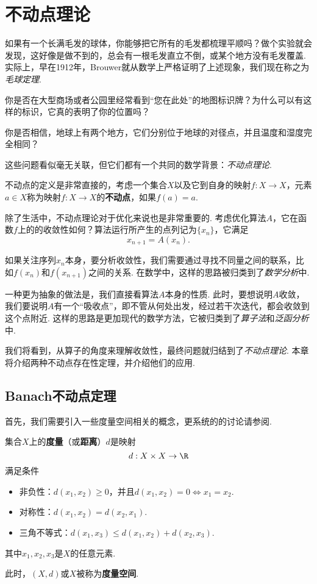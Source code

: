 \chapter{不动点理论}\label{chap:fixed-point-theory}

如果有一个长满毛发的球体，你能够把它所有的毛发都梳理平顺吗？做个实验就会发现，这好像是做不到的，总会有一根毛发直立不倒，或某个地方没有毛发覆盖. 实际上，早在1912年，Brouwer就从数学上严格证明了上述现象，我们现在称之为\emph{毛球定理}.

你是否在大型商场或者公园里经常看到“您在此处”的地图标识牌？为什么可以有这样的标识，它真的表明了你的位置吗？

你是否相信，地球上有两个地方，它们分别位于地球的对径点，并且温度和湿度完全相同？

这些问题看似毫无关联，但它们都有一个共同的数学背景：\emph{不动点理论}.

不动点的定义是非常直接的，考虑一个集合$X$以及它到自身的映射$f:X\to X$，元素$a\in X$称为映射$f:X\to X$的\textbf{不动点}，如果$f(a)=a$. 

除了生活中，不动点理论对于优化来说也是非常重要的. 考虑优化算法$A$，它在函数$f$上的的收敛性如何？算法运行所产生的点列记为$\{x_n\}$，它满足
\[x_{n+1}=A(x_n).\] 

如果关注序列$x_n$本身，要分析收敛性，我们需要通过寻找不同量之间的联系，比如$f(x_n)$和$f(x_{n+1})$之间的关系. 在数学中，这样的思路被归类到了\emph{数学分析}中.  

一种更为抽象的做法是，我们直接看算法$A$本身的性质. 此时，要想说明$A$收敛，我们要说明$A$有一个“吸收点”，即不管从何处出发，经过若干次迭代，都会收敛到这个点附近. 这样的思路是更加现代的数学方法，它被归类到了\emph{算子法}和\emph{泛函分析}中. 

我们将看到，从算子的角度来理解收敛性，最终问题就归结到了\emph{不动点理论}. 本章将介绍两种不动点存在性定理，并介绍他们的应用.

\section{Banach不动点定理}

首先，我们需要引入一些度量空间相关的概念，更系统的的讨论请参阅.

\begin{definition}[度量与度量空间]
集合$X$上的\textbf{度量}（或\textbf{距离}）$d$是映射
\[d:X\times X\to \R\]
满足条件
\begin{itemize}
\item 非负性：$d(x_1,x_2)\geq 0$，并且$d(x_1,x_2)=0\iff x_1=x_2$.
\item 对称性：$d(x_1,x_2)=d(x_2,x_1)$.
\item 三角不等式：$d(x_1,x_3)\leq d(x_1,x_2)+d(x_2,x_3)$.
\end{itemize}
其中$x_1,x_2,x_3$是$X$的任意元素. 

此时，$(X,d)$或$X$被称为\textbf{度量空间}.
\end{definition}

